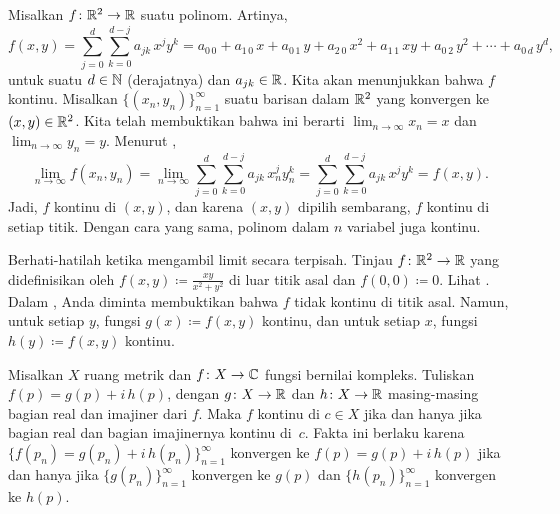 \begin{example}
Misalkan $f \colon {\mathbb{R}}^2 \to {\mathbb{R}}$ suatu polinom.  Artinya,
\begin{equation*}
f(x,y) =
\sum_{j=0}^d
\sum_{k=0}^{d-j}
a_{jk}\,x^jy^k =
a_{0\,0} + a_{1\,0} \, x +
a_{0\,1} \, y+  
a_{2\,0} \, x^2+  
a_{1\,1} \, xy+  
a_{0\,2} \, y^2+ \cdots +
a_{0\,d} \, y^d ,
\end{equation*}
untuk suatu $d \in {\mathbb{N}}$ (derajatnya) dan $a_{jk} \in {\mathbb{R}}$.  Kita akan menunjukkan 
bahwa $f$ kontinu.  Misalkan $\bigl\{ (x_n,y_n) \bigr\}_{n=1}^\infty$ suatu barisan
dalam ${\mathbb{R}}^2$ yang konvergen ke $(x,y) \in {\mathbb{R}}^2$.  Kita telah membuktikan bahwa ini
berarti $\lim_{n\to\infty} x_n = x$ dan $\lim_{n\to\infty} y_n = y$.
Menurut ,
\begin{equation*}
\lim_{n\to\infty}
f(x_n,y_n) =
\lim_{n\to\infty}
\sum_{j=0}^d
\sum_{k=0}^{d-j}
a_{jk} \, x_n^jy_n^k 
=
\sum_{j=0}^d
\sum_{k=0}^{d-j}
a_{jk} \, x^jy^k
=
f(x,y) .
\end{equation*}
Jadi, $f$ kontinu di $(x,y)$, dan karena $(x,y)$ dipilih sembarang, $f$
kontinu di setiap titik.  Dengan cara yang sama,
polinom dalam $n$ variabel juga kontinu.
\end{example}

Berhati-hatilah ketika mengambil limit secara terpisah.
Tinjau $f \colon {\mathbb{R}}^2 \to {\mathbb{R}}$ yang didefinisikan oleh $f(x,y) \coloneqq \frac{xy}{x^2+y^2}$
di luar titik asal dan $f(0,0) \coloneqq 0$.
Lihat .
Dalam ,
Anda diminta membuktikan bahwa $f$ tidak kontinu di titik asal.
Namun, untuk setiap $y$, fungsi $g(x) \coloneqq f(x,y)$
kontinu,
dan untuk setiap $x$, fungsi $h(y) \coloneqq f(x,y)$ kontinu.
\begin{myfigureht}
\caption{Grafik $\frac{xy}{x^2+y^2}$.\label{fig:xyxsqysq}}
\end{myfigureht}

\begin{example}
Misalkan $X$ ruang metrik dan $f \colon X \to {\mathbb{C}}$ fungsi bernilai
kompleks.  Tuliskan $f(p) = g(p) + i \, h(p)$, dengan $g \colon X \to {\mathbb{R}}$
dan $h \colon X \to {\mathbb{R}}$ masing-masing bagian real dan imajiner dari $f$.
Maka $f$ kontinu di $c \in X$ jika dan hanya jika bagian real
dan bagian imajinernya kontinu di~$c$.  
Fakta ini berlaku karena $\bigl\{ f(p_n) = g(p_n) + i \, h(p_n) \bigr\}_{n=1}^\infty$
konvergen ke $f(p) = g(p) + i \, h(p)$ jika dan hanya jika
$\bigl\{ g(p_n) \bigr\}_{n=1}^\infty$ konvergen ke $g(p)$ dan
$\bigl\{ h(p_n) \bigr\}_{n=1}^\infty$ konvergen ke $h(p)$.
\end{example}

